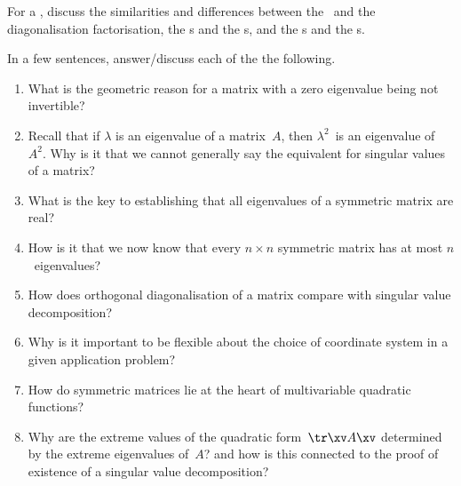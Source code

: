 \begin{exercise} \label{ex:} 
For a , discuss the similarities and differences between the \svd\ and the diagonalisation factorisation, the s and the s, and the s and the s.
\end{exercise}



\begin{exercise} \label{ex:} 
In a few sentences, answer\slash discuss each of the the following.
\begin{enumerate}
\item What is the geometric reason for a matrix with a zero eigenvalue being not invertible?

\item Recall that if \(\lambda\) is an eigenvalue of a matrix~\(A\), then \(\lambda^2\)~is an eigenvalue of~\(A^2\).
Why is it that we cannot generally say the equivalent for singular values of a matrix?

\item What is the key to establishing that all eigenvalues of a symmetric matrix are real?

\item How is it that we now know that every \(n\times n\) symmetric matrix has at most \(n\)~eigenvalues?

\item How does orthogonal diagonalisation of a matrix compare with singular value decomposition?

\item Why is it important to be flexible about the choice of coordinate system in a given application problem?

\item How do symmetric matrices lie at the heart of multivariable quadratic functions?

\item Why are the extreme values of the quadratic form~\(\tr\xv A\xv\) determined by the extreme eigenvalues of~\(A\)? and how is this connected to the proof of existence of a singular value decomposition?

\end{enumerate}
\end{exercise}

\begin{comment}%
why, what caused X?
how did X occur?
what-if? what-if-not?
how does X compare with Y?
what is the evidence for X?
why is X important?
\end{comment}


